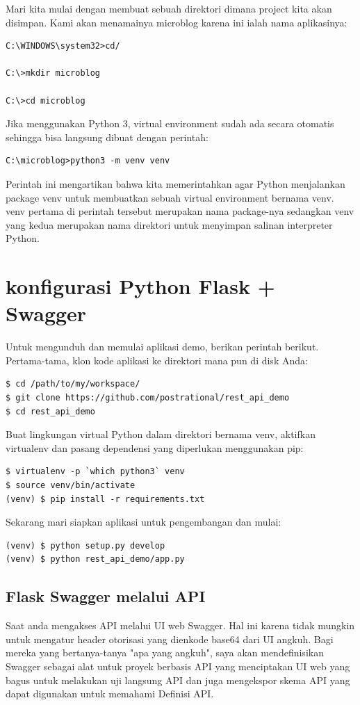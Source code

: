 \documentclass[12pt]{article}
\begin{document}
Mari kita mulai dengan membuat sebuah direktori dimana project kita akan disimpan. Kami akan menamainya microblog karena ini ialah nama aplikasinya:

\begin{verbatim}
C:\WINDOWS\system32>cd/

C:\>mkdir microblog

C:\>cd microblog
\end{verbatim}

Jika menggunakan Python 3, virtual environment sudah ada secara otomatis sehingga bisa langsung dibuat dengan perintah:

\begin{verbatim}
C:\microblog>python3 -m venv venv
\end{verbatim}

Perintah ini mengartikan bahwa kita memerintahkan agar Python menjalankan package venv untuk membuatkan sebuah virtual environment bernama venv. venv pertama di perintah tersebut merupakan nama package-nya sedangkan venv yang kedua merupakan nama direktori untuk menyimpan salinan interpreter Python.


\section{konfigurasi Python Flask + Swagger}
Untuk mengunduh dan memulai aplikasi demo, berikan perintah berikut. Pertama-tama, klon kode aplikasi ke direktori mana pun di disk Anda:
\begin{verbatim}
$ cd /path/to/my/workspace/
$ git clone https://github.com/postrational/rest_api_demo
$ cd rest_api_demo
\end{verbatim}
Buat lingkungan virtual Python dalam direktori bernama venv, aktifkan virtualenv dan pasang dependensi yang diperlukan menggunakan pip:
\begin{verbatim}
$ virtualenv -p `which python3` venv
$ source venv/bin/activate
(venv) $ pip install -r requirements.txt
\end{verbatim}
Sekarang mari siapkan aplikasi untuk pengembangan dan mulai:
\begin{verbatim}
(venv) $ python setup.py develop
(venv) $ python rest_api_demo/app.py
\end{verbatim}
\cite{de2017api}

\subsection{Flask Swagger melalui API}
Saat anda mengakses API melalui UI web Swagger. Hal ini karena tidak mungkin untuk mengatur header otorisasi yang dienkode base64 dari UI angkuh. Bagi mereka yang bertanya-tanya "apa yang angkuh", saya akan mendefinisikan Swagger sebagai alat untuk proyek berbasis API yang menciptakan UI web yang bagus untuk melakukan uji langsung API dan juga mengekspor skema API yang dapat digunakan untuk memahami Definisi API.
\end{document}
